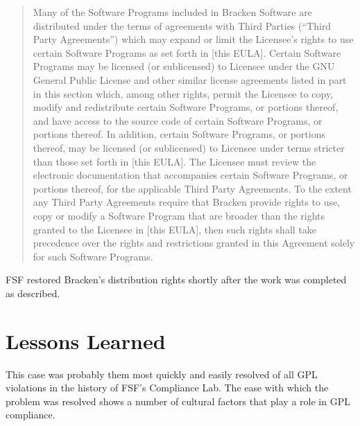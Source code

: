 \documentclass[12pt]{report}
\begin{document}
\begin{quotation}
Many of the Software Programs included in Bracken Software are distributed
under the terms of agreements with Third Parties (``Third Party
Agreements'') which may expand or limit the Licensee's rights to use
certain Software Programs as set forth in [this EULA].  Certain Software
Programs may be licensed (or sublicensed) to Licensee under the GNU
General Public License and other similar license agreements listed in part
in this section which, among other rights, permit the Licensee to copy,
modify and redistribute certain Software Programs, or portions thereof,
and have access to the source code of certain Software Programs, or
portions thereof.  In addition, certain Software Programs, or portions
thereof, may be licensed (or sublicensed) to Licensee under terms stricter
than those set forth in [this EULA].  The Licensee must review the
electronic documentation that accompanies certain Software Programs, or
portions thereof, for the applicable Third Party Agreements.  To the
extent any Third Party Agreements require that Bracken provide rights to
use, copy or modify a Software Program that are broader than the rights
granted to the Licensee in [this EULA], then such rights shall take
precedence over the rights and restrictions granted in this Agreement
solely for such Software Programs.
\end{quotation}

FSF restored Bracken's distribution rights shortly after the work was
completed as described.

\section{Lessons Learned}

This case was probably them most quickly and easily resolved of all GPL
violations in the history of FSF's Compliance Lab.  The ease with which
the problem was resolved shows a number of cultural factors that play a
role in GPL compliance.
\end{document}
